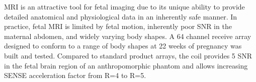 MRI is an attractive tool for fetal imaging due to its unique ability to provide detailed anatomical and physiological
data in an inherently safe manner. In practice, fetal MRI is limited by fetal motion, inherently poor SNR in the
maternal abdomen, and widely varying body shapes. A 64 channel receive array designed to conform to a range of body
shapes at 22 weeks of pregnancy was built and tested. Compared to standard product arrays, the coil provides 5%
SNR in the fetal brain region of an anthropomorphic phantom and allows increasing SENSE acceleration factor from R=4 to
R=5.

